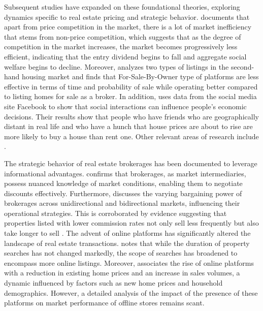 \documentclass[12pt]{article}
\begin{document}
Subsequent studies have expanded on these foundational theories, exploring dynamics specific to real estate pricing and strategic behavior. \citet{550a6ccf-cde2-3dd1-979f-1a8db2b8ceb9} documents that apart from price competition in the market, there is a lot of market inefficiency that stems from non-price competition, which suggests that as the degree of competition in the market increases, the market becomes progressively less efficient, indicating that the entry dividend begins to fall and aggregate social welfare begins to decline. Moreover, \citet{hendel_relative_2009} analyzes two types of listings in the second-hand housing market and finds that For-Sale-By-Owner type of platforms are less effective in terms of time and probability of sale while operating better compared to listing homes for sale as a broker. In addition, \citet{bailey_economic_2018} uses data from the social media site Facebook to show that social interactions can influence people's economic decisions. Their results show that people who have friends who are geographically distant in real life and who have a hunch that house prices are about to rise are more likely to buy a house than rent one. Other relevant areas of research include \citep{SIRMANS1991207, NIEUWERBURGH_information, salz_intermediation_2022}.

The strategic behavior of real estate brokerages has been documented to leverage informational advantages. \citet{AGARWAL2019715} confirms that brokerages, as market intermediaries, possess nuanced knowledge of market conditions, enabling them to negotiate discounts effectively. Furthermore, \citet{HAN2015813} discusses the varying bargaining power of brokerages across unidirectional and bidirectional markets, influencing their operational strategies. This is corroborated by evidence suggesting that properties listed with lower commission rates not only sell less frequently but also take longer to sell \citep{10.1257/app.20160214}. The advent of online platforms has significantly altered the landscape of real estate transactions. \citet{ZUMPANO2003134} notes that while the duration of property searches has not changed markedly, the scope of searches has broadened to encompass more online listings. Moreover, \citet{ZHANG2021101104} associates the rise of online platforms with a reduction in existing home prices and an increase in sales volumes, a dynamic influenced by factors such as new home prices and household demographics. However, a detailed analysis of the impact of the presence of these platforms on market performance of offline stores remains scant.
\end{document}
